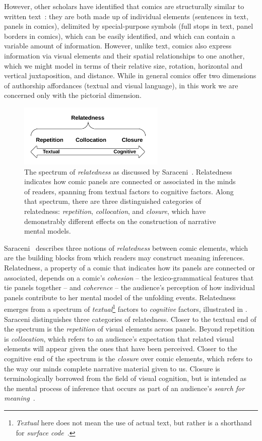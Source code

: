 However, other scholars have identified that comics are structurally similar to written
text~\cite{saraceni2016relatedness}: they are both made up of individual
elements (sentences in text, panels in comics), delimited by special-purpose
symbols (full stops in text, panel borders in comics), which can be easily
identified, and which can contain a variable amount of information. However,
unlike text, comics also express information via visual elements and their spatial
relationships to one another, which we might model in terms of their
relative size, rotation, horizontal and vertical juxtaposition, and
distance. While in general comics offer two dimensions of authorship
affordances (textual and visual language), in this work we are concerned
only with the pictorial dimension.
%
\begin{figure}
\centering
	\includegraphics[width=7cm]{relatedness.png}
	\caption{
		The spectrum of \emph{relatedness} as discussed by
                Saraceni~\cite{saraceni2016relatedness}. Relatedness indicates how 
		comic panels are connected or associated in the minds of 
		readers, spanning from textual factors to cognitive factors. 
		Along that spectrum, there are three  distinguished 
		categories of relatedness: \emph{repetition}, 
		\emph{collocation}, and \emph{closure}, which have
		demonstrably different effects on the construction of
		narrative mental models.
		}
	\label{figure:relatedness}
\end{figure}
%
Saraceni~\cite{saraceni2016relatedness} describes three notions of
\emph{relatedness} between comic elements, which are the building blocks
from which readers may construct meaning inferences.
Relatedness, a property of a comic that indicates how its panels are
connected or associated, depends on a comic's \emph{cohesion} -- the
lexico-grammatical features that tie panels together -- and \emph{coherence} --
the audience's perception of how individual panels contribute to her mental model
of the unfolding events. Relatedness emerges from a spectrum of \emph{textual}\footnote{\emph{Textual} here does not mean the use of actual text, but rather is a shorthand for \emph{surface code}~\cite{zwaan1998situation}.}
factors to \emph{cognitive} factors, illustrated in .
%
Saraceni distinguishes three categories of relatedness.
Closer to the textual end of the spectrum is the \emph{repetition} of visual
elements across panels. Beyond repetition is \emph{collocation}, which refers
to an audience's expectation that related visual elements will appear given the
ones that have been perceived. Closer to the cognitive end of the spectrum is
the \emph{closure} over comic elements, which refers to the way our minds 
complete narrative material given to us. Closure is terminologically borrowed 
from the field of visual cognition, but is intended as the mental process 
of inference that occurs as part of an audience's 
\emph{search for meaning}~\cite{gerrig1994readers}.

